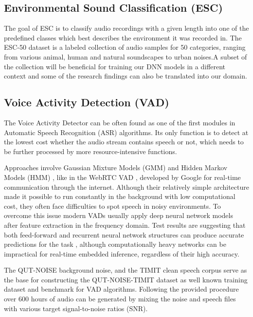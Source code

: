 \subsection{Environmental Sound Classification (ESC)}
The goal of ESC is to classify audio recordings with a given length into one of the predefined classes which best describes the environment it was recorded in. The ESC-50 dataset \cite{ESC_dataset} is a labeled collection of audio samples for 50 categories, ranging from various animal, human and natural soundscapes to urban noises.A subset of the collection will be beneficial for training our DNN models in a different context and some of the research findings can also be translated into our domain.

\subsection{Voice Activity Detection (VAD)}
The Voice Activity Detector can be often found as one of the first modules in Automatic Speech Recognition (ASR) algorithms. Its only function is to detect at the lowest cost whether the audio stream contains speech or not, which needs to be further processed by more resource-intensive functions.

Approaches involve Gaussian Mixture Models (GMM) \cite{reynolds2009gaussianMM} and Hidden Markov Models (HMM) \cite{eddy2004hiddenMM}, like in the WebRTC VAD \cite{webrtc_vad}, developed by Google for real-time communication through the internet. Although their relatively simple architecture made it possible to run constantly in the background with low computational cost, they often face difficulties to spot speech in noisy environments. To overcome this issue modern VADs usually apply deep neural network models after feature extraction in the frequency domain. Test results are suggesting that both feed-forward and recurrent neural network structures can produce accurate predictions for the task \cite{sehgal18convolutional_vad}, although computationally heavy networks can be impractical for real-time embedded inference, regardless of their high accuracy.



The QUT-NOISE \cite{qut_noise} background noise, and the TIMIT \cite{timit} clean speech corpus serve as the base for constructing the QUT-NOISE-TIMIT dataset as well known training dataset and benchmark for VAD algorithms. Following the provided procedure over 600 hours of audio can be generated by mixing the noise and speech files with various target signal-to-noise ratios (SNR).

